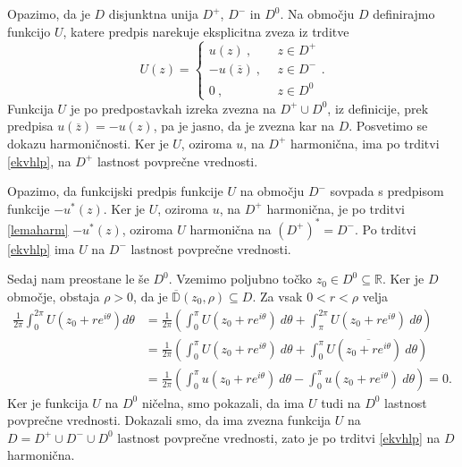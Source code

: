 \documentclass[mat1, tisk]{fmfdelo}
\begin{document}
    \begin{dokaz}
        Opazimo, da je $D$ disjunktna unija $D^+$, $D^-$ in $D^0$.
        Na območju $D$ definirajmo funkcijo $U$, katere predpis narekuje eksplicitna zveza iz trditve
        $$
        U(z) = 
        \begin{cases}
            u(z)~,~~&z \in D^{+}\\
            -u(\overline{z})~,~~&z \in D^{-}\\
            0~,~~ &z \in D^0
        \end{cases}
        .
        $$
        Funkcija $U$ je po predpostavkah izreka zvezna na $D^+ \cup D^0$, iz definicije, prek predpisa $u(\overline{z}) = - u(z)$, pa je jasno, da je zvezna kar na $D$. 
        Posvetimo se dokazu harmoničnosti.
        Ker je $U$, oziroma $u$, na $D^+$ harmonična, ima po trditvi \ref{ekvhlp}, na $D^+$ lastnost povprečne vrednosti. 

        Opazimo, da funkcijski predpis funkcije $U$ na območju $D^-$ sovpada s predpisom funkcije $- u^*(z)$. 
        Ker je $U$, oziroma $u$, na $D^+$ harmonična, je po trditvi \ref{lemaharm} $-u^*(z)$, oziroma $U$ harmonična na $(D^+)^* = D^-$.
        Po trditvi \ref{ekvhlp} ima $U$ na $D^-$ lastnost povprečne vrednosti. 
        
        Sedaj nam preostane le še $D^0$.
        Vzemimo poljubno točko $z_0 \in D^0 \subseteq \mathbb{R}$. Ker je $D$ območje, obstaja $\rho > 0$, da je $\overline{\mathbb{D}}(z_0, \rho) \subseteq D$. Za vsak $0 < r < \rho$ velja
        \begin{align*}
            \frac{1}{2 \pi} \int_{0}^{2 \pi}{U(z_0 + re^{i \theta}) d\theta} &= \frac{1}{2 \pi} \left(\int_{0}^{\pi}U(z_0 + re^{i \theta})~d\theta + \int_{\pi}^{2\pi} U(z_0 + re^{i \theta})~d\theta\right) \\
            & = \frac{1}{2 \pi} \left(\int_{0}^{\pi}U(z_0 + re^{i \theta})~d\theta + \int_{0}^{\pi}U(\overline{z_0 + re^{i \theta}})~d\theta\right) \\
            &= \frac{1}{2 \pi} \left(\int_{0}^{\pi}u(z_0 + re^{i \theta})~d\theta - \int_{0}^{\pi}u(z_0 + re^{i \theta})~d\theta\right) = 0.
        \end{align*}        
        Ker je funkcija $U$ na $D^0$ ničelna, smo pokazali, da ima $U$ tudi na $D^0$ lastnost povprečne vrednosti. 
        Dokazali smo, da ima zvezna funkcija $U$ na $D = D^+ \cup D^- \cup D^0$ lastnost povprečne vrednosti, zato je po trditvi \ref{ekvhlp} na $D$ harmonična.
    \end{dokaz}
\end{document}
